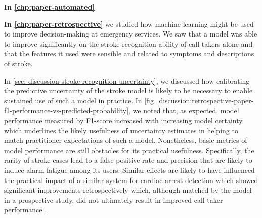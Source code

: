 
\vspace{3em}
\textbf{In \cref{chp:paper-automated}} 

\vspace{3em}
\textbf{In \cref{chp:paper-retrospective}} we studied how machine learning might be used to improve decision-making at emergency services. 
We saw that a model was able to improve significantly on the stroke recognition ability of call-takers alone and that the features it used were sensible and related to symptoms and descriptions of stroke. 

In \cref{sec: discussion-stroke-recognition-uncertainty}, we discussed how calibrating the predictive uncertainty of the stroke model is likely to be necessary to enable sustained use of such a model in practice. In \cref{fig_discussion:retrospective-paper-f1-performance-vs-predicted-probability}, we noted that, as expected, model performance measured by F1-score increased with increasing model certainty which underlines the likely usefulness of uncertainty estimates in helping to match practitioner expectations of such a model. Nonetheless, basic metrics of model performance are still obstacles for its practical usefulness. Specifically, the rarity of stroke cases lead to a false positive rate and precision that are likely to induce alarm fatigue among its users. Similar effects are likely to have influenced the practical impact of a similar system for cardiac arrest detection which showed significant improvements retrospectively \parencite{cite14} which, although matched by the model in a prospective study, did not ultimately result in improved call-taker performance \parencite{cite15}. 

